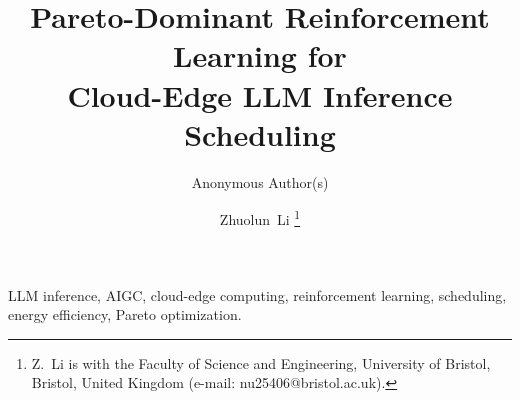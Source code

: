 \documentclass[journal]{IEEEtran}
\title{Pareto-Dominant Reinforcement Learning for\\
Cloud-Edge LLM Inference Scheduling}
\author{Anonymous Author(s)}
\author{Zhuolun~Li
  \thanks{Z.~Li is with the Faculty of Science and Engineering,
    University of Bristol, Bristol, United Kingdom
    (e-mail: nu25406@bristol.ac.uk).}
}
\begin{document}
\maketitle



\begin{IEEEkeywords}
LLM inference, AIGC, cloud-edge computing, reinforcement learning,
scheduling, energy efficiency, Pareto optimization.
\end{IEEEkeywords}

\IEEEpeerreviewmaketitle












\end{document}
